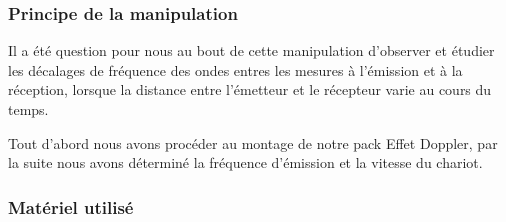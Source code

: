 \documentclass[a4paper]{article}
\begin{document}
\subsubsection{Principe de la manipulation}





Il a été question pour nous au bout de cette manipulation d’observer et étudier les décalages de fréquence des ondes entres les mesures à l’émission et à la réception, lorsque la distance entre l’émetteur et le récepteur varie au cours du temps.

Tout d’abord nous avons procéder au montage de notre pack Effet Doppler, par la suite nous avons déterminé la fréquence d’émission et la vitesse du chariot.










\subsubsection{Matériel utilisé}
\end{document}
